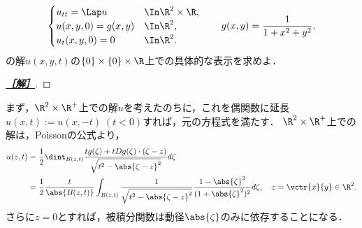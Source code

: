 \documentclass[uplatex,dvipdfmx]{jsarticle}
\begin{document}
\begin{problem}
    \[\begin{cases}
        u_{tt}=\Lap u&\In\R^2\times\R,\\
        u(x,y,0)=g(x,y)&\In\R^2,\\
        u_t(x,y,0)=0&\In\R^2.
    \end{cases}\qquad g(x,y)=\frac{1}{1+x^2+y^2}.\]
    の解$u(x,y,t)$の$\{0\}\times\{0\}\times\R$上での具体的な表示を求めよ．
\end{problem}
\begin{proof}[\bf\underline{［解］}]
    
\end{proof}
\begin{consideration*}
    まず，$\R^2\times\R^+$上での解$u$を考えたのちに，これを偶関数に延長$u(x,t):=u(x,-t)\;(t<0)$すれば，元の方程式を満たす．
    $\R^2\times\R^+$上での解は，Poissonの公式より，
    \begin{align*}
        u(z,t)&=\frac{1}{2}\dint_{B(z,t)}\frac{tg(\zeta)+tDg(\zeta)\cdot(\zeta-z)}{\sqrt{t^2-\abs{\zeta-z}^2}}d\zeta\\
        &=\frac{1}{2}\frac{t}{\abs{B(z,t)}}\int_{B(z,t)}\frac{1}{\sqrt{t^2-\abs{\zeta-z}^2}}\frac{1-\abs{\zeta}^2}{(1+\abs{\zeta}^2)^2}d\zeta,\quad z=\vctr{x}{y}\in\R^2.
    \end{align*}
    さらに$z=0$とすれば，被積分関数は動径$\abs{\zeta}$のみに依存することになる．
\end{consideration*}
\end{document}
